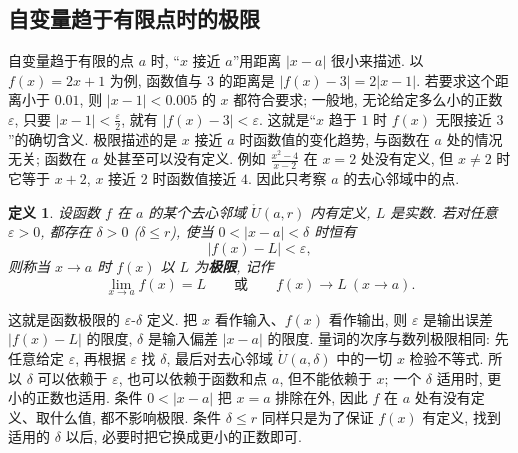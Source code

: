 \documentclass[UTF8,openany]{ctexbook}
\theoremstyle{chinesetextbook}
\newtheorem{definition}{定义}[section]
\begin{document}
\subsection{自变量趋于有限点时的极限}
自变量趋于有限的点 $a$ 时, “$x$ 接近 $a$”用距离 $|x-a|$ 很小来描述. 以 $f(x)=2x+1$ 为例, 函数值与 $3$ 的距离是 $|f(x)-3|=2|x-1|$. 若要求这个距离小于 $0.01$, 则 $|x-1|<0.005$ 的 $x$ 都符合要求; 一般地, 无论给定多么小的正数 $\varepsilon$, 只要 $\displaystyle|x-1|<\frac\varepsilon2$, 就有 $|f(x)-3|<\varepsilon$. 这就是“$x$ 趋于 $1$ 时 $f(x)$ 无限接近 $3$”的确切含义. 极限描述的是 $x$ 接近 $a$ 时函数值的变化趋势, 与函数在 $a$ 处的情况无关; 函数在 $a$ 处甚至可以没有定义. 例如 $\displaystyle\frac{x^2-4}{x-2}$ 在 $x=2$ 处没有定义, 但 $x\ne2$ 时它等于 $x+2$, $x$ 接近 $2$ 时函数值接近 $4$. 因此只考察 $a$ 的去心邻域中的点.
\begin{definition}
设函数 $f$ 在 $a$ 的某个去心邻域 $\mathring U(a,r)$ 内有定义, $L$ 是实数. 若对任意 $\varepsilon>0$, 都存在 $\delta>0$ ($\delta\le r$), 使当 $0<|x-a|<\delta$ 时恒有
\[
|f(x)-L|<\varepsilon,
\]
则称当 $x\to a$ 时 $f(x)$ 以 $L$ 为\textbf{极限}, 记作
\[
\lim_{x\to a}f(x)=L\qquad\text{或}\qquad f(x)\to L\ (x\to a).
\]
\end{definition}
这就是函数极限的 $\varepsilon$-$\delta$ 定义. 把 $x$ 看作输入、$f(x)$ 看作输出, 则 $\varepsilon$ 是输出误差 $|f(x)-L|$ 的限度, $\delta$ 是输入偏差 $|x-a|$ 的限度. 量词的次序与数列极限相同: 先任意给定 $\varepsilon$, 再根据 $\varepsilon$ 找 $\delta$, 最后对去心邻域 $\mathring U(a,\delta)$ 中的一切 $x$ 检验不等式. 所以 $\delta$ 可以依赖于 $\varepsilon$, 也可以依赖于函数和点 $a$, 但不能依赖于 $x$; 一个 $\delta$ 适用时, 更小的正数也适用. 条件 $0<|x-a|$ 把 $x=a$ 排除在外, 因此 $f$ 在 $a$ 处有没有定义、取什么值, 都不影响极限. 条件 $\delta\le r$ 同样只是为了保证 $f(x)$ 有定义, 找到适用的 $\delta$ 以后, 必要时把它换成更小的正数即可.
\end{document}
